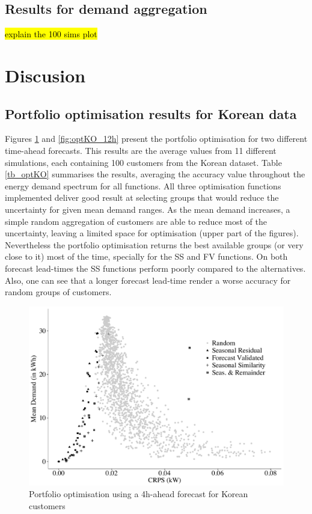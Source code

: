 \documentclass[review, 3p, 12pt, authoryear]{elsarticle}
\begin{document}
\subsection{Results for demand aggregation}
\label{ss:res_demaggr}
\hl{explain the 100 sims plot}


\section{Discusion}
\label{sec:discussion}

\subsection{Portfolio optimisation results for Korean data}
\label{ss:portoptKO}
Figures \ref{fig:optKO_04h} and \ref{fig:optKO_12h} present the portfolio optimisation for two different time-ahead forecasts. This results are the average values from 11 different simulations, each containing 100 customers from the Korean dataset.
Table \ref{tb_optKO} summarises the results, averaging the accuracy value throughout the energy demand spectrum for all functions.
All three optimisation functions implemented deliver good result at selecting groups that would reduce the uncertainty for given mean demand ranges.
As the mean demand increases, a simple random aggregation of customers are able to reduce most of the uncertainty, leaving a limited space for optimisation (upper part of the figures).
Nevertheless the portfolio optimisation returns the best available groups (or very close to it) most of the time, specially for the SS and FV functions.
On both forecast lead-times the SS functions perform poorly compared to the alternatives.
Also, one can see that a longer forecast lead-time render a worse accuracy for random groups of customers.

\begin{figure}
  \centering
  \includegraphics[width=0.8\columnwidth]{2017-11-27_runf_KO_04h.pdf}
  \caption{Portfolio optimisation using a 4h-ahead forecast for Korean customers}
  \label{fig:optKO_04h}
\end{figure}
\end{document}
